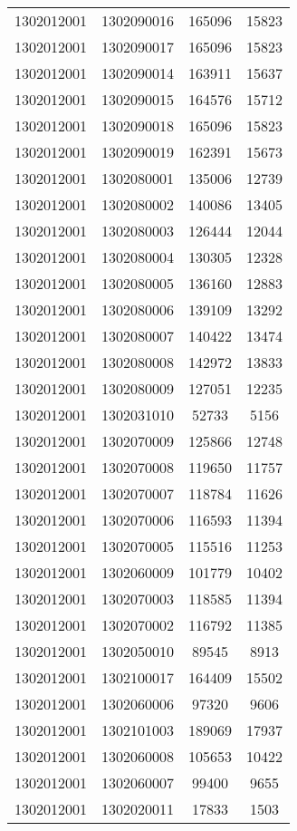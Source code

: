 \begin{longtable}[h]{llcc}
		1302012001 & 1302090016 & 165096 & 15823\\
		1302012001 & 1302090017 & 165096 & 15823\\
		1302012001 & 1302090014 & 163911 & 15637\\
		1302012001 & 1302090015 & 164576 & 15712\\
		1302012001 & 1302090018 & 165096 & 15823\\
		1302012001 & 1302090019 & 162391 & 15673\\
		1302012001 & 1302080001 & 135006 & 12739\\
		1302012001 & 1302080002 & 140086 & 13405\\
		1302012001 & 1302080003 & 126444 & 12044\\
		1302012001 & 1302080004 & 130305 & 12328\\
		1302012001 & 1302080005 & 136160 & 12883\\
		1302012001 & 1302080006 & 139109 & 13292\\
		1302012001 & 1302080007 & 140422 & 13474\\
		1302012001 & 1302080008 & 142972 & 13833\\
		1302012001 & 1302080009 & 127051 & 12235\\
		1302012001 & 1302031010 & 52733 & 5156\\
		1302012001 & 1302070009 & 125866 & 12748\\
		1302012001 & 1302070008 & 119650 & 11757\\
		1302012001 & 1302070007 & 118784 & 11626\\
		1302012001 & 1302070006 & 116593 & 11394\\
		1302012001 & 1302070005 & 115516 & 11253\\
		1302012001 & 1302060009 & 101779 & 10402\\
		1302012001 & 1302070003 & 118585 & 11394\\
		1302012001 & 1302070002 & 116792 & 11385\\
		1302012001 & 1302050010 & 89545 & 8913\\
		1302012001 & 1302100017 & 164409 & 15502\\
		1302012001 & 1302060006 & 97320 & 9606\\
		1302012001 & 1302101003 & 189069 & 17937\\
		1302012001 & 1302060008 & 105653 & 10422\\
		1302012001 & 1302060007 & 99400 & 9655\\
		1302012001 & 1302020011 & 17833 & 1503\\

\end{longtable}
